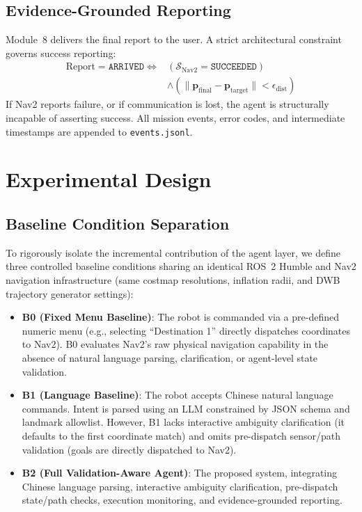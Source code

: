\documentclass[conference]{IEEEtran}
\begin{document}
\subsection{Evidence-Grounded Reporting}
Module~8 delivers the final report to the user. A strict architectural constraint governs success reporting:
\begin{equation}
\label{eq:evidence}
\begin{aligned}
\text{Report} = \texttt{ARRIVED} \iff & (\mathcal{S}_{\text{Nav2}} = \texttt{SUCCEEDED}) \\
& \land (\|\mathbf{p}_{\text{final}} - \mathbf{p}_{\text{target}}\| < \epsilon_{\text{dist}})
\end{aligned}
\end{equation}
If Nav2 reports failure, or if communication is lost, the agent is structurally incapable of asserting success. All mission events, error codes, and intermediate timestamps are appended to \texttt{events.jsonl}.

\section{Experimental Design}

\subsection{Baseline Condition Separation}
To rigorously isolate the incremental contribution of the agent layer, we define three controlled baseline conditions sharing an identical ROS~2 Humble and Nav2 navigation infrastructure (same costmap resolutions, inflation radii, and DWB trajectory generator settings):
\begin{itemize}
    \item \textbf{B0 (Fixed Menu Baseline)}: The robot is commanded via a pre-defined numeric menu (e.g., selecting ``Destination 1'' directly dispatches coordinates to Nav2). B0 evaluates Nav2's raw physical navigation capability in the absence of natural language parsing, clarification, or agent-level state validation.
    \item \textbf{B1 (Language Baseline)}: The robot accepts Chinese natural language commands. Intent is parsed using an LLM constrained by JSON schema and landmark allowlist. However, B1 lacks interactive ambiguity clarification (it defaults to the first coordinate match) and omits pre-dispatch sensor/path validation (goals are directly dispatched to Nav2).
    \item \textbf{B2 (Full Validation-Aware Agent)}: The proposed system, integrating Chinese language parsing, interactive ambiguity clarification, pre-dispatch state/path checks, execution monitoring, and evidence-grounded reporting.
\end{itemize}
\end{document}
